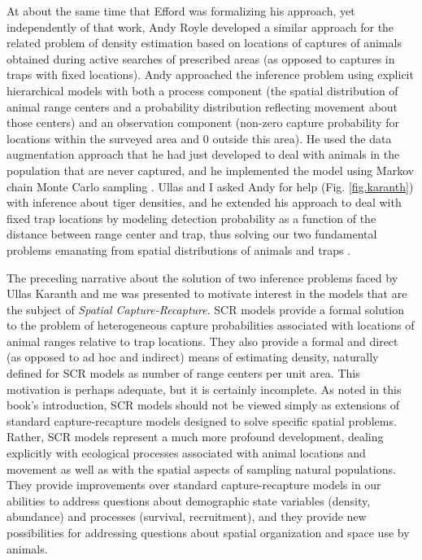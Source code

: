 At about the same time that Efford was formalizing his approach, yet
independently of that work, Andy Royle developed a similar approach
for the related problem of density estimation based on locations of
captures of animals obtained during active searches of prescribed
areas (as opposed to captures in traps with fixed locations). Andy
approached the inference problem using explicit hierarchical models
with both a process component (the spatial distribution of animal
range centers and a probability distribution reflecting movement about
those centers) and an observation component (non-zero capture
probability for locations within the surveyed area and 0 outside this
area). He used the data augmentation approach that he had just
developed \citep{royle_etal:2007} to deal with animals in the
population that are never captured, and he implemented the model using
Markov chain Monte Carlo sampling \citep{royle_young:2008}.  Ullas and
I asked Andy for help (Fig. \ref{fig.karanth}) with inference about
tiger densities, and he extended his approach to deal with fixed trap
locations by modeling detection probability as a function of the
distance between range center and trap, thus solving our two
fundamental problems emanating from spatial distributions of animals
and traps \citep{royle_etal:2009jae, royle_etal:2009ecol}.

The preceding narrative about the solution of two inference problems
faced by Ullas Karanth and me was presented to motivate interest in
the models that are the subject of {\it Spatial
  Capture-Recapture}. SCR models provide a formal solution to the
problem of heterogeneous capture probabilities associated with
locations of animal ranges relative to trap locations. They also
provide a formal and direct (as opposed to ad hoc and indirect) means
of estimating density, naturally defined for SCR models as number of
range centers per unit area.  This motivation is perhaps adequate, but
it is certainly incomplete. As noted in this book's introduction, SCR
models should not be viewed simply as extensions of standard
capture-recapture models designed to solve specific spatial
problems. Rather, SCR models represent a much more profound
development, dealing explicitly with ecological processes associated
with animal locations and movement as well as with the spatial aspects
of sampling natural populations. They provide improvements over
standard capture-recapture models in our abilities to address
questions about demographic state variables (density, abundance) and
processes (survival, recruitment), and they provide new possibilities
for addressing questions about spatial organization and space use by
animals.




